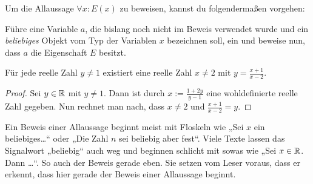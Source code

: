 \begin{axiom}\label{allbeweis} 
    Um die Allaussage $\forall x: E(x)$ zu beweisen, kannst du folgendermaßen vorgehen:
    
    Führe eine Variable $a$, die bislang noch nicht im Beweis verwendet wurde und ein \emph{beliebiges} Objekt vom Typ der Variablen $x$ bezeichnen soll, ein und beweise nun, dass $a$ die Eigenschaft $E$ besitzt.
\end{axiom}


\begin{bsp} \label{bsp:allbeweis}
    Für jede reelle Zahl $y\neq 1$ existiert eine reelle Zahl $x\neq 2$ mit $y=\frac{x+1}{x-2}$.
\end{bsp}
\begin{proof}
    Sei $y\in \mathbb R$ mit $y\neq 1$. Dann ist durch $x:= \frac{1+2y}{y-1}$ eine wohldefinierte reelle Zahl gegeben. Nun rechnet man nach, dass $x\neq 2$ und $\frac{x+1}{x-2}=y$.
\end{proof}

  
\begin{bem}[Signalwörter]
    Ein Beweis einer Allaussage beginnt meist mit Floskeln wie „Sei $x$ ein beliebiges\dots“ oder „Die Zahl $n$ sei beliebig aber fest“. Viele Texte lassen das Signalwort „beliebig“ auch weg und beginnen schlicht mit sowas wie „Sei $x\in \mathbb R$. Dann \dots“. So auch der Beweis gerade eben. Sie setzen vom Leser voraus, dass er erkennt, dass hier gerade der Beweis einer Allaussage beginnt.
\end{bem}


